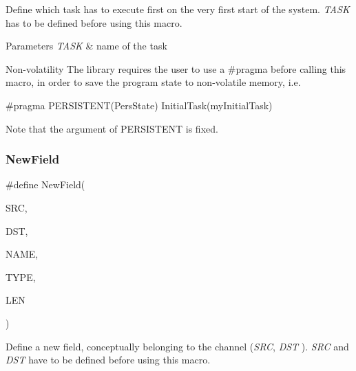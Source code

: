 Define which task has to execute first on the very first start of the system. {\itshape T\+A\+SK} has to be defined before using this macro. 


\begin{DoxyParams}{Parameters}
{\em T\+A\+SK} & name of the task\\
\hline
\end{DoxyParams}
\begin{DoxyParagraph}{Non-\/volatility}
The library requires the user to use a {\ttfamily \#pragma} before calling this macro, in order to save the program state to non-\/volatile memory, i.\+e. \begin{DoxyVerb}#pragma PERSISTENT(PersState)
InitialTask(myInitialTask)
\end{DoxyVerb}
 Note that the argument of {\ttfamily P\+E\+R\+S\+I\+S\+T\+E\+NT} is fixed. 
\end{DoxyParagraph}
\mbox{\label{group__interpow__declaration_gafcc1282442066a75e573d78ae3b6dac1}} 
\subsubsection{\texorpdfstring{New\+Field}{NewField}}
{\footnotesize\ttfamily \#define New\+Field(\begin{DoxyParamCaption}\item[{}]{S\+RC,  }\item[{}]{D\+ST,  }\item[{}]{N\+A\+ME,  }\item[{}]{T\+Y\+PE,  }\item[{}]{L\+EN }\end{DoxyParamCaption})}



Define a new field, conceptually belonging to the channel ({\itshape S\+RC}, {\itshape D\+ST} ). {\itshape S\+RC} and {\itshape D\+ST} have to be defined before using this macro. 


